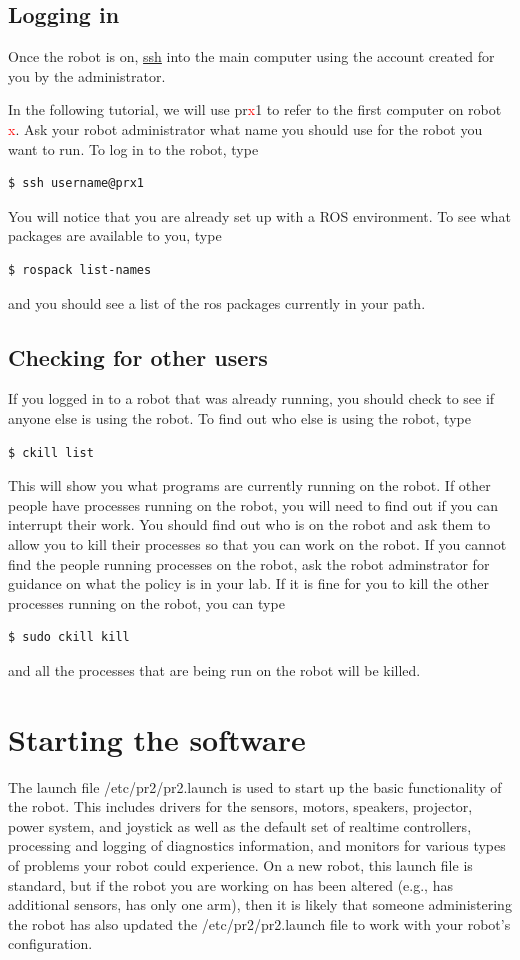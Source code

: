 \subsection{Logging in}
Once the robot is on, \href{http://unixhelp.ed.ac.uk/CGI/man-cgi?ssh}{ssh} into the main computer using the account 
created for you by the administrator. 

In the following tutorial, we will use pr\textcolor{red}{x}1 to refer to the first computer on robot \textcolor{red}{x}.  
Ask your robot  administrator what name you should use for the robot you want to run. To log in to the robot, type
\begin{verbatim}
$ ssh username@prx1
\end{verbatim}
You will notice that you are already set up with a ROS environment.  To see what packages are available to you, type
\begin{verbatim}
$ rospack list-names
\end{verbatim}
and you should see a list of the ros packages currently in your path.

\subsection{Checking for other users}
If you logged in to a robot that was already running, you should check to see if anyone else is using the robot. To 
find out who else is using the robot, type
\begin{verbatim}
$ ckill list
\end{verbatim}
This will show you what programs are currently running on the robot.  If other people have processes running on the 
robot, you will need to find out if you can interrupt their work. You should find out who is on the robot and ask them 
to allow you to kill their processes so that you can work on the robot.  If you cannot find the people running processes 
on the robot, ask the robot adminstrator for guidance on what the policy is in your lab. If it is fine for you to kill 
the other processes running on the robot, you can type
\begin{verbatim}
$ sudo ckill kill
\end{verbatim}
and all the processes that are being run on the robot will be killed.
\section{Starting the software}
The launch file /etc/pr2/pr2.launch is used to start up the basic functionality of the robot.  This includes drivers for 
the sensors, motors, speakers, projector, power system, and joystick as well as the default set of realtime controllers, 
processing and logging of diagnostics information, and monitors for various types of problems your robot could experience.  On a new robot, this launch file is standard, but if the robot you are working on has been altered (e.g., has additional sensors, has only one arm), then it is likely that someone administering the robot has also updated the /etc/pr2/pr2.launch file to work with your robot's configuration.

